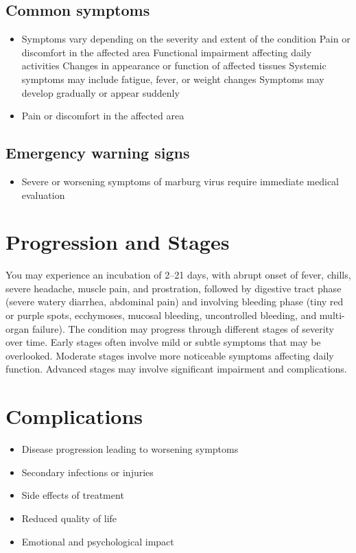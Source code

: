 \subsection{Common symptoms}
\begin{itemize}[noitemsep]
  \item Symptoms vary depending on the severity and extent of the condition Pain or discomfort in the affected area Functional impairment affecting daily activities Changes in appearance or function of affected tissues Systemic symptoms may include fatigue, fever, or weight changes Symptoms may develop gradually or appear suddenly
  \item Pain or discomfort in the affected area
  \end{itemize}

\subsection{Emergency warning signs}
\begin{itemize}[noitemsep]
  \item Severe or worsening symptoms of marburg virus require immediate medical evaluation
\end{itemize}
\section{Progression and Stages}
You may experience an incubation of 2--21 days, with abrupt onset of fever, chills, severe headache, muscle pain, and prostration, followed by digestive tract phase (severe watery diarrhea, abdominal pain) and involving bleeding phase (tiny red or purple spots, ecchymoses, mucosal bleeding, uncontrolled bleeding, and multi-organ failure). The condition may progress through different stages of severity over time. Early stages often involve mild or subtle symptoms that may be overlooked. Moderate stages involve more noticeable symptoms affecting daily function. Advanced stages may involve significant impairment and complications.
\section{Complications}
\begin{itemize}[noitemsep]
  \item Disease progression leading to worsening symptoms
  \item Secondary infections or injuries
  \item Side effects of treatment
  \item Reduced quality of life
  \item Emotional and psychological impact
\end{itemize}

